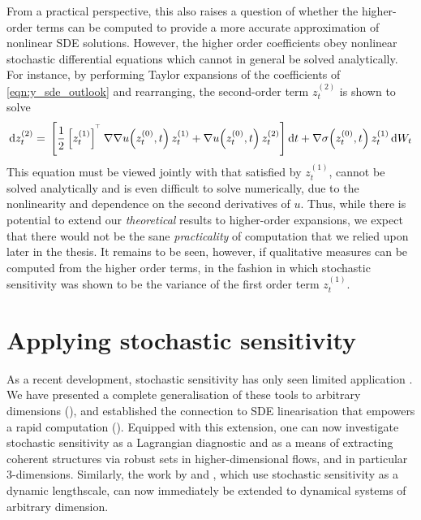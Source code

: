 From a practical perspective, this also raises a question of whether the higher-order terms can be computed to provide a more accurate approximation of nonlinear SDE solutions.
However, the higher order coefficients obey nonlinear stochastic differential equations which cannot in general be solved analytically.
For instance, by performing Taylor expansions of the coefficients of \cref{eqn:y_sde_outlook} and rearranging, the second-order term \(z_t^{(2)}\) is shown to solve
\[
	\dif z_t^{(2)} = \begin{multlined}[t]
		\left[\frac12 \left[z_t^{(1)}\right]^{\T} \nabla\nabla u\!\left(z_t^{(0)}, t\right) z_t^{(1)} + \nabla u\!\left(z_t^{(0)}, t\right) z_t^{(2)}\right]\dif t + \nabla \sigma\!\left(z_t^{(0)}, t\right) z_t^{(1)}\dif W_t
	\end{multlined}
\]
This equation must be viewed jointly with that satisfied by \(z_t^{(1)}\), cannot be solved analytically and is even difficult to solve numerically, due to the nonlinearity and dependence on the second derivatives of \(u\).
Thus, while there is potential to extend our \emph{theoretical} results to higher-order expansions, we expect that there would not be the sane \emph{practicality} of computation that we relied upon later in the thesis.
It remains to be seen, however, if qualitative measures can be computed from the higher order terms, in the fashion in which stochastic sensitivity was shown to be the variance of the first order term \(z_t^{(1)}\).


\section{Applying stochastic sensitivity}\label{sec:s2_disc}
As a recent development, stochastic sensitivity has only seen limited application \citep{BadzaEtAl_2023_HowSensitiveAre,Balasuriya_2020_UncertaintyFinitetimeLyapunov,FangEtAl_2020_DisentanglingResolutionPrecision,FangOuellette_2021_AssessingInformationContent}.
We have presented a complete generalisation of these tools to arbitrary dimensions (), and established the connection to SDE linearisation that empowers a rapid computation ().
Equipped with this extension, one can now investigate stochastic sensitivity as a Lagrangian diagnostic and as a means of extracting coherent structures via robust sets in higher-dimensional flows, and in particular 3-dimensions.
Similarly, the work by \citet{FangEtAl_2020_DisentanglingResolutionPrecision} and \citet{FangOuellette_2021_AssessingInformationContent}, which use stochastic sensitivity as a dynamic lengthscale, can now immediately be extended to dynamical systems of arbitrary dimension.

